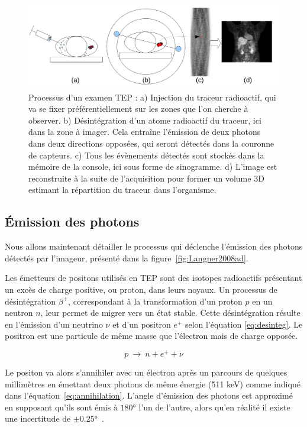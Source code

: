 \begin{figure}
\centering
\includegraphics[width=16cm]{images/schemaTEP}
\caption[Présentation simplifiée de la TEP]{Processus d'un examen TEP : a) Injection du traceur radioactif, qui va se fixer préférentiellement sur les zones que l'on cherche à observer. b) Désintégration d'un atome radioactif du traceur, ici dans la zone à imager. Cela entraîne l'émission de deux photons dans deux directions opposées, qui seront détectés dans la couronne de capteurs. c) Tous les évènements détectés sont stockés dans la mémoire de la console, ici sous forme de sinogramme. d) L'image est reconstruite à la suite de l'acquisition pour former un volume 3D estimant la répartition du traceur dans l'organisme.}
\label{fig:schemaTEP}
\end{figure}

	\subsection{\'Emission des photons}

Nous allons maintenant détailler le processus qui déclenche l'émission des photons détectés par l'imageur, présenté dans la figure~\ref{fig:Langner2008ad}.

Les émetteurs de positons utilisés en TEP sont des isotopes radioactifs présentant un excès de charge positive, ou proton, dans leurs noyaux. Un processus de désintégration $\beta^+$, correspondant à la transformation d’un proton $p$ en un neutron $n$, leur permet de migrer vers un état stable. Cette désintégration résulte en l’émission d’un neutrino $\nu$ et d’un positron $e^+$ selon l’équation \ref{eq:desinteg}. Le positron est une particule de même masse que l’électron mais de charge opposée.

\begin{equation}
 p~\rightarrow~n + e^+ + \nu
\label{eq:desinteg}
\end{equation}

Le positon va alors s'annihiler avec un électron après un parcours de quelques millimètres en émettant deux photons de même énergie (511 keV) comme indiqué dans l'équation~\ref{eq:annihilation}. L'angle d'émission des photons est approximé en supposant qu'ils sont émis à $180°$ l'un de l'autre, alors qu'en réalité il existe une incertitude de $\pm 0.25°$~\cite{bailey2005positron}.

